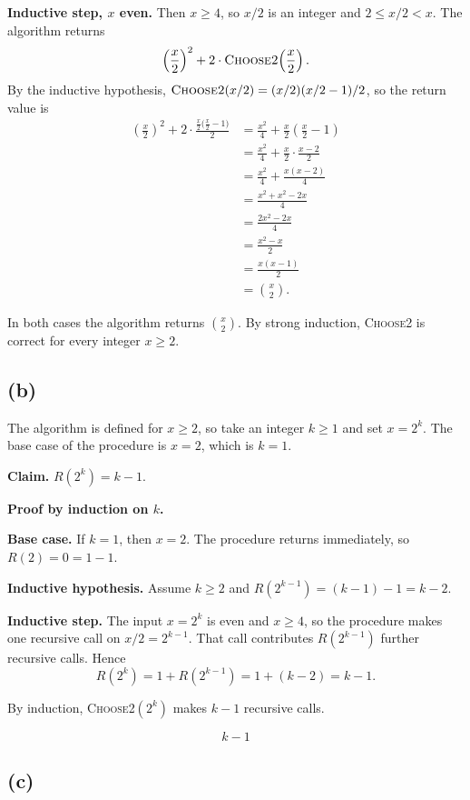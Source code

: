 \documentclass[11pt]{article}
\begin{document}
\textbf{Inductive step, $x$ even.} Then $x\ge 4$, so $x/2$ is an integer and $2\le x/2<x$. The algorithm returns
\[
\left(\frac{x}{2}\right)^{2}+2\cdot\textsc{Choose2}\!\left(\frac{x}{2}\right).
\]
By the inductive hypothesis, $\textsc{Choose2}(x/2)=(x/2)(x/2-1)/2$, so the return value is
\begin{align*}
\left(\frac{x}{2}\right)^{2}+2\cdot\frac{\tfrac{x}{2}\bigl(\tfrac{x}{2}-1\bigr)}{2}
&= \frac{x^{2}}{4}+\frac{x}{2}\left(\frac{x}{2}-1\right)\\
&= \frac{x^{2}}{4}+\frac{x}{2}\cdot\frac{x-2}{2}\\
&= \frac{x^{2}}{4}+\frac{x(x-2)}{4}\\
&= \frac{x^{2}+x^{2}-2x}{4}\\
&= \frac{2x^{2}-2x}{4}\\
&= \frac{x^{2}-x}{2}\\
&= \frac{x(x-1)}{2}\\
&= \binom{x}{2}.
\end{align*}

In both cases the algorithm returns $\binom{x}{2}$. By strong induction, \textsc{Choose2} is correct for every integer $x\ge 2$.

\subsection*{(b)}

The algorithm is defined for $x\ge 2$, so take an integer $k\ge 1$ and set $x=2^{k}$. The base case of the procedure is $x=2$, which is $k=1$.

\textbf{Claim.} $R(2^{k})=k-1$.

\textbf{Proof by induction on $k$.}

\textbf{Base case.} If $k=1$, then $x=2$. The procedure returns immediately, so $R(2)=0=1-1$.

\textbf{Inductive hypothesis.} Assume $k\ge 2$ and $R(2^{k-1})=(k-1)-1=k-2$.

\textbf{Inductive step.} The input $x=2^{k}$ is even and $x\ge 4$, so the procedure makes one recursive call on $x/2=2^{k-1}$. That call contributes $R(2^{k-1})$ further recursive calls. Hence
\[
R(2^{k})=1+R(2^{k-1})=1+(k-2)=k-1.
\]

By induction, \textsc{Choose2}$(2^{k})$ makes $k-1$ recursive calls.

\[
\boxed{k-1}
\]

\subsection*{(c)}
\end{document}
